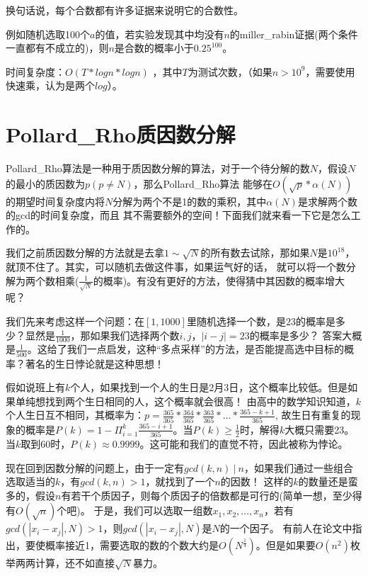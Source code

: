 {\heiti 换句话说，每个合数都有许多证据来说明它的合数性。}

例如随机选取100个$a$的值，若实验发现其中均没有$n$的miller\_rabin证据(两个条件一直都有不成立的)，则$n$是合数的概率小于$0.25^{100}$。


时间复杂度：$O(T*logn*logn)$ ，其中$T$为测试次数，（如果$n>10^9$，需要使用快速乘，认为是两个$log$）。


\section{Pollard\_Rho质因数分解}

Pollard\_Rho算法是一种用于质因数分解的算法，对于一个待分解的数$N$，假设$N$的最小的质因数为$p(p\neq N)$，那么Pollard\_Rho算法
能够在$O(\sqrt{p}*\alpha(N))$的期望时间复杂度内将$N$分解为两个不是1的数的乘积，其中$\alpha(N)$是求解两个数的gcd的时间复杂度，而且
其不需要额外的空间！下面我们就来看一下它是怎么工作的。

我们之前质因数分解的方法就是去拿$1\sim \sqrt{N}$的所有数去试除，那如果$N$是$10^{18}$，就顶不住了。其实，可以随机去做这件事，如果运气好的话，
就可以将一个数分解为两个数相乘($\frac{1}{\sqrt{N}}$的概率)。有没有更好的方法，使得猜中其因数的概率增大呢？

我们先来考虑这样一个问题：在$[1,1000]$里随机选择一个数，是$23$的概率是多少？显然是$\frac{1}{1000}$，那如果我们选择两个数$i,j$，$|i-j|=23$的概率是多少？
答案大概是$\frac{1}{500}$。这给了我们一点启发，这种“多点采样”的方法，是否能提高选中目标的概率？著名的生日悖论就是这种思想！

假如说班上有$k$个人，如果找到一个人的生日是2月3日，这个概率比较低。但是如果单纯想找到两个生日相同的人，这个概率就会很高！
由高中的数学知识知道，$k$个人生日互不相同，其概率为：$p=\frac{365}{365}*\frac{364}{365}*\frac{363}{365}*...*\frac{365-k+1}{365}$,
故生日有重复的现象的概率是$P(k) = 1 - \Pi_{i=1}^k\frac{365-i+1}{365}$。当$P(k)\ge\frac{1}{2}$时，解得$k$大概只需要23。
当$k$取到$60$时，$P(k)\approx 0.9999$。这可能和我们的直觉不符，因此被称为悖论。

现在回到因数分解的问题上，由于一定有$gcd(k,n)\ |\ n$，如果我们通过一些组合选取适当的$k$，有$gcd(k,n)>1$，就找到了一个$n$的因数！
这样的$k$的数量还是蛮多的，假设$n$有若干个质因子，则每个质因子的倍数都是可行的(简单一想，至少得有$O(\sqrt{n})$个吧)。
于是，我们可以选取一组数$x_1,x_2,...,x_n$，若有$gcd(|x_i-x_j|,N)>1$，则$gcd(|x_i-x_j|,N)$是$N$的一个因子。
有前人在论文中指出，要使概率接近1，需要选取的数的个数大约是$O(N^{\frac{1}{4}})$。但是如果要$O(n^2)$枚举两两计算，还不如直接$\sqrt{N}$暴力。


